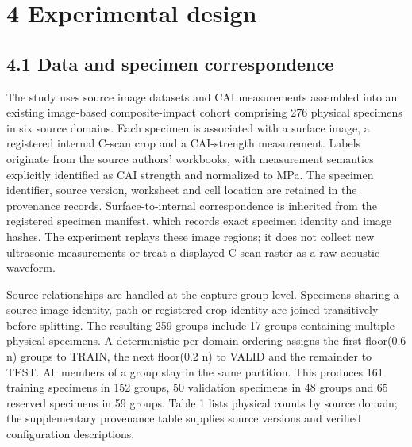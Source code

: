 \hypertarget{experimental-design}{%
\section{4 Experimental design}\label{experimental-design}}

\hypertarget{data-and-specimen-correspondence}{%
\subsection{4.1 Data and specimen correspondence}\label{data-and-specimen-correspondence}}

The study uses source image datasets \citep{hasebe2022data} and CAI measurements \citep{hasebe2025data, data_cai} assembled into an existing image-based composite-impact cohort comprising 276 physical specimens in six source domains. Each specimen is associated with a surface image, a registered internal C-scan crop and a CAI-strength measurement. Labels originate from the source authors' workbooks, with measurement semantics explicitly identified as CAI strength and normalized to MPa. The specimen identifier, source version, worksheet and cell location are retained in the provenance records. Surface-to-internal correspondence is inherited from the registered specimen manifest, which records exact specimen identity and image hashes. The experiment replays these image regions; it does not collect new ultrasonic measurements or treat a displayed C-scan raster as a raw acoustic waveform.

Source relationships are handled at the capture-group level. Specimens sharing a source image identity, path or registered crop identity are joined transitively before splitting. The resulting 259 groups include 17 groups containing multiple physical specimens. A deterministic per-domain ordering assigns the first floor(0.6 n) groups to TRAIN, the next floor(0.2 n) to VALID and the remainder to TEST. All members of a group stay in the same partition. This produces 161 training specimens in 152 groups, 50 validation specimens in 48 groups and 65 reserved specimens in 59 groups. Table 1 lists physical counts by source domain; the supplementary provenance table supplies source versions and verified configuration descriptions.

